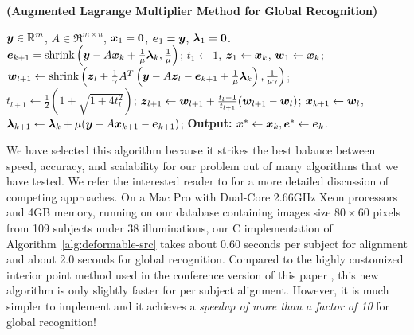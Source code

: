 \documentclass[12pt,journal,draftcls,letterpaper,onecolumn]{IEEEtran}
\begin{document}
\begin{algorithm}[t]
\caption{\bf (Augmented Lagrange Multiplier Method for Global
Recognition)}
\begin{algorithmic}[1]
\begin{small}
 ${\boldsymbol{y}} \in \mathbb R^m$, $A \in \Re^{m \times n}$,
${\boldsymbol{x}}_1 = \boldsymbol{0}$, $\boldsymbol{e}_1 = {\boldsymbol{y}}$, $\boldsymbol{\lambda}_1 =
\boldsymbol{0}$.
\STATE $\boldsymbol{e}_{k+1} = \textup{shrink}\left({\boldsymbol{y}} - A{\boldsymbol{x}}_k +
\frac{1}{\mu}\boldsymbol{\lambda}_k, \frac{1}{\mu}\right)$;
\STATE $t_1\leftarrow 1$, $\boldsymbol{z}_1 \leftarrow {\boldsymbol{x}}_k$, $\boldsymbol{w}_1 \leftarrow {\boldsymbol{x}}_k$;
\STATE $\boldsymbol{w}_{l+1} \leftarrow \textup{shrink}\left(\boldsymbol{z}_l +
\frac{1}{\gamma}A^T\left({\boldsymbol{y}} - A\boldsymbol{z}_l - \boldsymbol{e}_{k+1} +
\frac{1}{\mu}\boldsymbol{\lambda}_k\right), \frac{1}{\mu\gamma}\right)$;
\STATE $t_{l+1} \leftarrow \frac{1}{2}\left( 1 +
\sqrt{1+4t_l^2}\right)$;
\STATE $\boldsymbol{z}_{l+1} \leftarrow \boldsymbol{w}_{l+1} + \frac{t_l - 1}{t_{l+1}}(\boldsymbol{w}_{l+1} - \boldsymbol{w}_l)$;
\ENDWHILE
\STATE ${\boldsymbol{x}}_{k+1} \leftarrow \boldsymbol{w}_{l}$,  \; $\boldsymbol{\lambda}_{k+1} \leftarrow \boldsymbol{\lambda}_k + \mu ({\boldsymbol{y}} - A{\boldsymbol{x}}_{k+1} - \boldsymbol{e}_{k+1})$;
\ENDWHILE \STATE
{\bf Output:} ${\boldsymbol{x}}^* \leftarrow {\boldsymbol{x}}_k, \boldsymbol{e}^* \leftarrow \boldsymbol{e}_k$.
\end{small}
\end{algorithmic}
\label{alg:alm}
\end{algorithm}

%

We have selected this algorithm because it strikes the best
balance between speed, accuracy, and scalability for our problem out of
many algorithms that we have tested. We refer the interested reader to
\cite{YangA2010-pp} for a more detailed discussion of competing
approaches.  On a Mac Pro with
Dual-Core 2.66GHz Xeon processors and 4GB memory, 
running on our database containing images size $80\times 60$ 
pixels from 109 subjects under 38 illuminations,
our C implementation of Algorithm~\ref{alg:deformable-src} takes
about 0.60 seconds per subject for alignment and about 2.0
seconds for global recognition. Compared to the highly
customized interior point method used in the conference version
of this paper \cite{Wagner2009-CVPR}, this new algorithm is 
only slightly faster for per subject alignment. However, it is
much simpler to implement and it achieves a
\emph{speedup of more than a factor of 10} for global
recognition!
\end{document}
